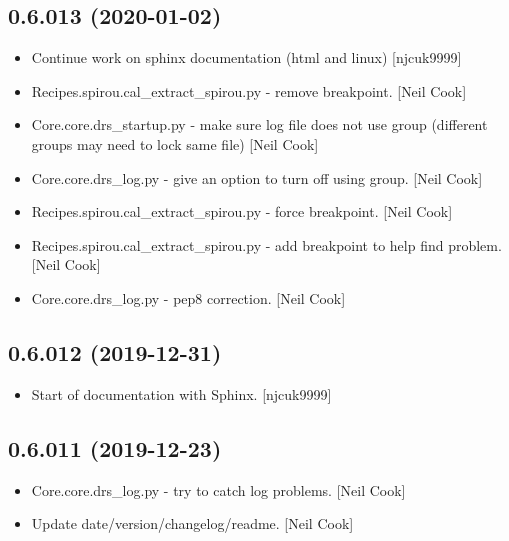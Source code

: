 \documentclass[a4paper,10pt,english]{report}
\begin{document}
\subsection{0.6.013 (2020-01-02)}
\label{\detokenize{misc/changelog:id4}}\begin{itemize}
\item {} 
Continue work on sphinx documentation (html and linux) {[}njcuk9999{]}

\item {} 
Recipes.spirou.cal\_extract\_spirou.py - remove breakpoint. {[}Neil Cook{]}

\item {} 
Core.core.drs\_startup.py - make sure log file does not use group
(different groups may need to lock same file) {[}Neil Cook{]}

\item {} 
Core.core.drs\_log.py - give an option to turn off using group. {[}Neil
Cook{]}

\item {} 
Recipes.spirou.cal\_extract\_spirou.py - force breakpoint. {[}Neil Cook{]}

\item {} 
Recipes.spirou.cal\_extract\_spirou.py - add breakpoint to help find
problem. {[}Neil Cook{]}

\item {} 
Core.core.drs\_log.py - pep8 correction. {[}Neil Cook{]}

\end{itemize}


\subsection{0.6.012 (2019-12-31)}
\label{\detokenize{misc/changelog:id5}}\begin{itemize}
\item {} 
Start of documentation with Sphinx. {[}njcuk9999{]}

\end{itemize}


\subsection{0.6.011 (2019-12-23)}
\label{\detokenize{misc/changelog:id6}}\begin{itemize}
\item {} 
Core.core.drs\_log.py - try to catch log problems. {[}Neil Cook{]}

\item {} 
Update date/version/changelog/readme. {[}Neil Cook{]}

\end{itemize}
\end{document}
